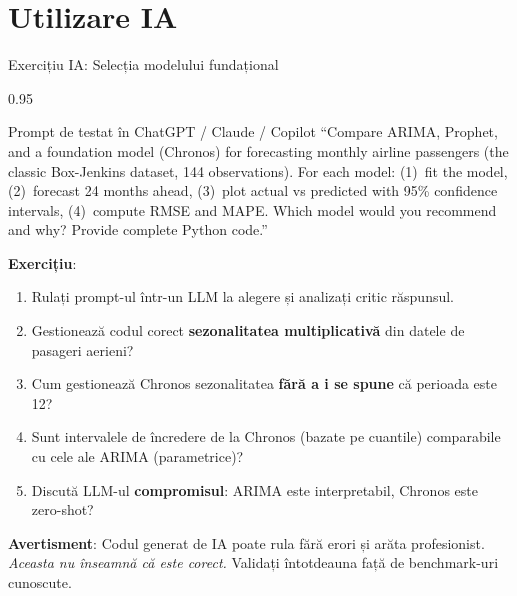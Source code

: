 \documentclass[9pt, aspectratio=169, t]{beamer}
\begin{document}
\section{Utilizare IA}

\begin{frame}{Exercițiu IA: Selecția modelului fundațional}
    \begin{cminipage}{0.95\textwidth}
    \vspace{-3mm}
    \begin{block}{\footnotesize Prompt de testat în ChatGPT / Claude / Copilot}
        {\footnotesize
        ``Compare ARIMA, Prophet, and a foundation model (Chronos) for forecasting monthly airline passengers (the classic Box-Jenkins dataset, 144 observations). For each model: (1)~fit the model, (2)~forecast 24 months ahead, (3)~plot actual vs predicted with 95\% confidence intervals, (4)~compute RMSE and MAPE. Which model would you recommend and why? Provide complete Python code.''
        }
    \end{block}
    \vspace{-2mm}
    {\footnotesize
    \textbf{Exercițiu}:
    \begin{enumerate}\setlength{\itemsep}{0pt}
        \item Rulați prompt-ul într-un LLM la alegere și analizați critic răspunsul.
        \item Gestionează codul corect \textbf{sezonalitatea multiplicativă} din datele de pasageri aerieni?
        \item Cum gestionează Chronos sezonalitatea \textbf{fără a i se spune} că perioada este 12?
        \item Sunt intervalele de încredere de la Chronos (bazate pe cuantile) comparabile cu cele ale ARIMA (parametrice)?
        \item Discută LLM-ul \textbf{compromisul}: ARIMA este interpretabil, Chronos este zero-shot?
    \end{enumerate}
    }
    \vspace{-2mm}
    \begin{alertblock}{}
        {\footnotesize \textbf{Avertisment}: Codul generat de IA poate rula fără erori și arăta profesionist. \textit{Aceasta nu înseamnă că este corect.} Validați întotdeauna față de benchmark-uri cunoscute.}
    \end{alertblock}
    \end{cminipage}
\end{frame}
\end{document}

